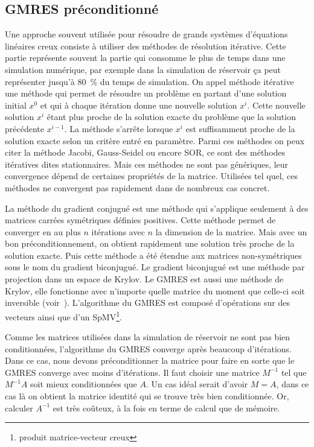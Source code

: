 \subsection{GMRES préconditionné}
Une approche souvent utilisée pour résoudre de grands systèmes d'équations linéaires creux consiste à utiliser des méthodes de résolution itérative.
%
Cette partie représente souvent la partie qui consomme le plus de temps dans une simulation numérique, par exemple dans la simulation de réservoir ça peut représenter jusqu'à 80~\% du temps de simulation.
%
On appel méthode itérative une méthode qui permet de résoudre un problème en partant d'une solution initial $x^0$ et qui à chaque itération donne une nouvelle solution $x^i$.
%
Cette nouvelle solution $x^i$ étant plus proche de la solution exacte du problème que la solution précédente $x^{i-1}$.
%
La méthode s'arrête lorsque $x^i$ est suffisamment proche de la solution exacte selon un critère entré en paramètre.
%
Parmi ces méthodes on peux citer la méthode Jacobi, Gauss-Seidel ou encore SOR, ce sont des méthodes itératives dites stationnaires.
%
Mais ces méthodes ne sont pas génériques, leur convergence dépend de certaines propriétés de la matrice.
%
Utilisées tel quel, ces méthodes ne convergent pas rapidement dans de nombreux cas concret.


La méthode du gradient conjugué est une méthode qui s'applique seulement à des matrices carrées symétriques définies positives.
%
Cette méthode permet de converger en au plus $n$ itérations avec $n$ la dimension de la matrice.
%
Mais avec un bon préconditionnement, on obtient rapidement une solution très proche de la solution exacte.
%
Puis cette méthode a été étendue aux matrices non-symétriques sous le nom du gradient biconjugué.
%
Le gradient biconjugué est une méthode par projection dans un espace de Krylov.
%
Le GMRES est aussi une méthode de Krylov, elle fonctionne avec n'importe quelle matrice du moment que celle-ci soit inversible (voir~\cite{Saad96IMSLS}).
%
L'algorithme du GMRES est composé d'opérations sur des vecteurs ainsi que d'un SpMV\footnote{produit matrice-vecteur creux}.

Comme les matrices utilisées dans la simulation de réservoir ne sont pas bien conditionnées, l'algorithme du GMRES converge après beaucoup d'itérations.
%
Dans ce cas, nous devons préconditionner la matrice pour faire en sorte que le GMRES converge avec moins d'itérations.
%
Il faut choisir une matrice $M^{-1}$ tel que $M^{-1}A$ soit mieux conditionnées que $A$.
%
Un cas idéal serait d'avoir $M=A$, dans ce cas là on obtient la matrice identité qui se trouve très bien conditionnée.
%
Or, calculer $A^{-1}$ est très coûteux, à la fois en terme de calcul que de mémoire.

